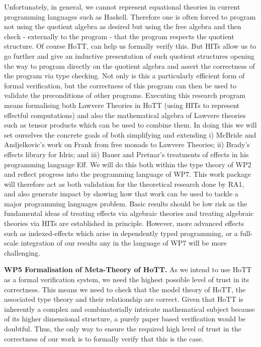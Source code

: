 \documentclass[a4paper,11pt]{article}
\begin{document}
Unfortunately, in general, we cannot represent equational theories in
current programming languages such as Haskell. Therefore one is often
forced to program not using the quotient algebra as desired but using
the free algebra and then check - externally to the program - that the
program respects the quotient structure. Of course HoTT, can help us
formally verify this. But HITs allow us to go further and give an
inductive presentation of such quotient structures opening the way to
program directly on the quotient algebra and assert the correctness of
the program via type checking. Not only is this a particularly
efficient form of formal verification, but the correctness of this
program can then be used to validate the preconditions of other
programs. Executing this research program means formalising both
Lawvere Theories in HoTT (using HITs to represent effectful
computations) and also the mathematical algebra of Lawvere theories
such as tensor products which can be used to combine them. In doing
this we will set ourselves the concrete goals of both simplifying and
extending i) McBride and Andjelkovic's work on Frank from free monads
to Lawvere Theories; ii) Brady's effects library for Idris; and iii)
Bauer and Pretnar's treatments of effects in his programming language
Eff.  We will do this both within the type theory of WP2 and reflect
progress into the programming language of WP7.  This work package will
therefore act as both validation for the theoretical research done by
RA1, and also generate impact by showing how that work can be used to
tackle a major programming languages problem. Basic results should be
low risk as the fundamental ideas of treating effects via algebraic
theories and treating algebraic theories via HITs are established in
principle. However, more advanced effects such as indexed-effects
which arise in dependently typed programming, or a full-scale integration
of our results any in the language of WP7 will be more challenging.


{\bf WP5 Formalisation of Meta-Theory of HoTT.}  As we intend to use
HoTT as a formal verification system, we need the highest possible
level of trust in its correctness. This means we need to check that
the model theory of HoTT, the associated type theory and their
relationship are correct. Given that HoTT is inherently a complex and
combinatorially intricate mathematical subject because of its higher
dimensional structure, a purely paper based verification would be
doubtful.  Thus, the only way to ensure the required high level of
trust in the correctness of our work is to formally verify that this
is the case.
\end{document}
